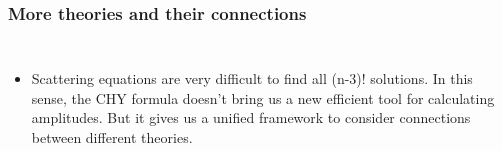 \documentclass[aspectratio=169]{beamer}%
\begin{document}
	\begin{frame}
		\frametitle{More theories and their connections}
		\begin{columns}
			\begin{itemize}
				\setlength{\itemsep}{.3cm}
				\item{
					Scattering equations are very difficult to find all (n-3)! solutions. In this sense, the CHY formula doesn't bring us a new efficient tool for calculating amplitudes. But it gives us a unified framework to consider connections between different theories.
				}
			\end{itemize}
		\end{columns}
	\end{frame}
	
\end{document}
